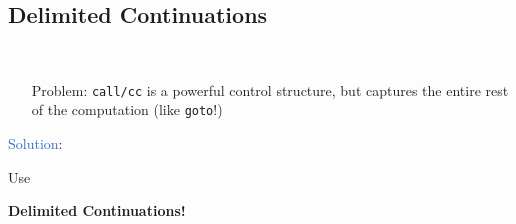\subsection{Delimited Continuations}
\begin{frame}[fragile]
	\frametitlesubs

	\begin{minipage}{.09\textwidth}
		\
	\end{minipage}
	\begin{minipage}{.9\textwidth}
		\begin{itemize}
			\item[\textcolor{subhighlight}{Problem}:]
			      \texttt{call/cc} is a powerful control structure, but captures the entire rest of the computation (like \texttt{goto}!)

		\end{itemize}
	\end{minipage}

	\pause
	\vspace{1\zh}
	\hspace{.2\zw}\textcolor{highlight}{Solution}:

	\centering
	\hspace{-.8\baselineskip}
	\begin{minipage}[t]{.60\textwidth}
		\vspace{.2\zh}
		\centering
		{\Large{}Use}

		\textbf{\large{}Delimited Continuations!}\cite{felleisen1988prompt}


\end{minipage}
\end{frame}
